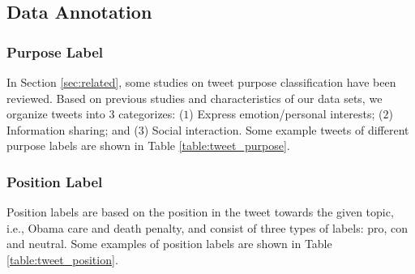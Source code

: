 \documentclass[letterpaper]{article}
\begin{document}
\subsection{Data Annotation}
\label{subsec:annotation}

\subsubsection{Purpose Label}
\label{subsubsec:purpose_label}
In Section \ref{sec:related}, some studies on tweet purpose classification have been reviewed. Based on previous studies and characteristics of our data sets, we organize tweets into $3$ categorizes: ($1$) Express emotion/personal interests; ($2$) Information sharing; and ($3$) Social interaction. Some example tweets of different purpose labels are shown in Table \ref{table:tweet_purpose}.

\subsubsection{Position Label}
\label{subsubsec:position_label}
Position labels are based on the position in the tweet towards the given topic, i.e., Obama care and death penalty, and consist of three types of labels: pro, con and neutral. Some examples of position labels are shown in Table \ref{table:tweet_position}.

\begin{table*}[ht]
\vspace{2ex}
\centering
\caption{Example tweets of different purpose labels.}
\label{table:tweet_purpose}
\end{table*}
\end{document}
